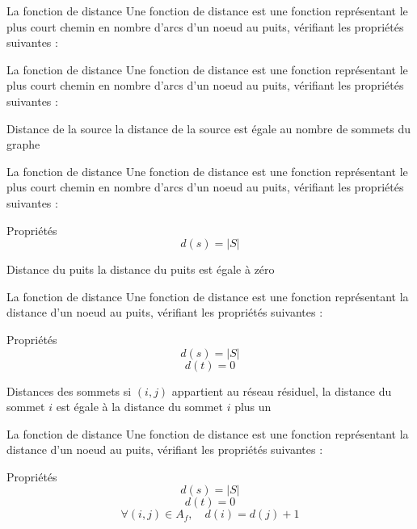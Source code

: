\begin{frame}{La fonction de distance}
	Une fonction de distance est une fonction représentant le plus court chemin en nombre d'arcs d'un
	noeud au puits, vérifiant les propriétés suivantes :\vfill
\end{frame}

\begin{frame}{La fonction de distance}
	Une fonction de distance est une fonction représentant le plus court chemin en nombre d'arcs d'un
	noeud au puits, vérifiant les propriétés suivantes : \vfill
	\begin{exampleblock}{Distance de la source}
		la distance de la source est égale au nombre de sommets du graphe
	\end{exampleblock} \vfill
\end{frame}

\begin{frame}{La fonction de distance}
	Une fonction de distance est une fonction représentant le plus court chemin en nombre d'arcs d'un
	noeud au puits, vérifiant les propriétés suivantes : \vfill
	\begin{block}{Propriétés}
		$$ d(s) = |S| $$
	\end{block} \vfill
	\begin{exampleblock}{Distance du puits}
		la distance du puits est égale à zéro
	\end{exampleblock} \vfill
\end{frame}

\begin{frame}{La fonction de distance}
	Une fonction de distance est une fonction représentant la distance d'un noeud au puits, vérifiant
	les propriétés suivantes : \vfill
	\begin{block}{Propriétés}
		$$ d(s) = |S| $$
		$$ d(t) = 0 $$
	\end{block} \vfill
	\begin{exampleblock}{Distances des sommets}
		si $(i,j)$ appartient au réseau résiduel, la distance du sommet $i$ est égale à la distance du sommet $i$ plus un
	\end{exampleblock}
\end{frame}

\begin{frame}{La fonction de distance}
	Une fonction de distance est une fonction représentant la distance d'un noeud au puits, vérifiant
	les propriétés suivantes : \vfill
	\begin{block}{Propriétés}
		$$ d(s) = |S| $$
		$$ d(t) = 0 $$
		$$ \forall (i,j) \in A_f,\quad d(i) = d(j) + 1 $$
	\end{block}
\end{frame}

